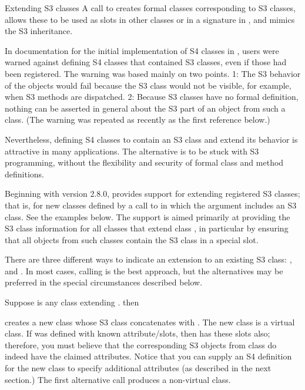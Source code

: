 %
\begin{Section}{Extending S3 classes}
A call to  creates formal classes corresponding
to S3 classes, allows these to be used as slots in other classes or in
a signature in , and mimics the S3
inheritance.

In documentation for the initial implementation of S4 classes in \R{},
users were warned against defining S4 classes that contained S3
classes, even if those had been registered.  The warning was based
mainly on two points.  1: The S3 behavior of the objects would fail
because the S3 class would not be visible, for example, when S3
methods are dispatched.  2: Because S3 classes have no formal
definition, nothing can be asserted in general about the S3 part of
an object from such a class.  (The warning was repeated as recently
as the first reference below.)

Nevertheless, defining S4 classes to contain an S3 class and extend
its behavior is attractive in many applications.  The alternative is
to be stuck with S3 programming, without the flexibility and security of
formal class and method definitions.

Beginning with version 2.8.0, \R{} provides support for extending
registered S3 classes; that is, for new classes defined by a call to
 in which the  argument
includes an S3 class.  See the examples below.  The support is aimed
primarily at providing the S3 class information for all classes that
extend class , in particular by ensuring that
all objects from such classes contain the S3 class in a special
slot.

There are three different ways to indicate an extension to an existing
S3 class:  ,   and
.  In most cases, calling  is the
best approach,  but the alternatives may be preferred in the special
circumstances described below.

Suppose  is any class extending . then


creates a new class  whose S3 class
concatenates   with .  The new class is a
virtual class.  If  was defined with known attribute/slots,
then  has these slots also; therefore, you must believe that
the corresponding S3 objects from class  do indeed have the
claimed attributes.  Notice that you can supply an S4 definition for the
new class to specify additional attributes (as described in the next
section.)
The first alternative call produces a non-virtual class.


\end{Section}
